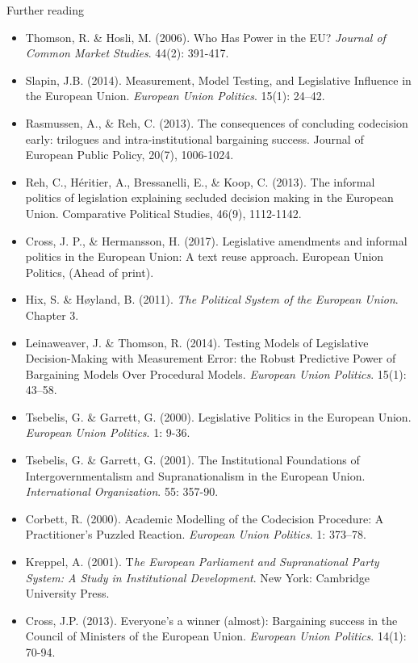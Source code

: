 \noindent Further reading

\begin{itemize}
	\item Thomson, R. \& Hosli, M. (2006). Who Has Power in the EU? \textit{Journal of Common Market Studies}. 44(2): 391-417.
	\item Slapin, J.B. (2014). Measurement, Model Testing, and Legislative Influence in the European Union. \textit{European Union Politics}. 15(1): 24–42.
	\item Rasmussen, A., \& Reh, C. (2013). The consequences of concluding codecision early: trilogues and intra-institutional bargaining success. Journal of European Public Policy, 20(7), 1006-1024.
	\item Reh, C., Héritier, A., Bressanelli, E., \& Koop, C. (2013). The informal politics of legislation explaining secluded decision making in the European Union. Comparative Political Studies, 46(9), 1112-1142.
	\item Cross, J. P., \& Hermansson, H. (2017). Legislative amendments and informal politics in the European Union: A text reuse approach. European Union Politics, (Ahead of print).
	\item Hix, S. \& H\o yland, B. (2011). \textit{The Political System of the European Union}. Chapter 3.
	\item Leinaweaver, J. \& Thomson, R. (2014). Testing Models of Legislative Decision-Making with Measurement Error: the Robust Predictive Power of Bargaining Models Over Procedural Models. \textit{European Union Politics}. 15(1): 43–58.
	\item Tsebelis, G. \& Garrett, G. (2000). Legislative Politics in the European Union. \textit{European Union Politics}. 1: 9-36.
	\item Tsebelis, G. \& Garrett, G. (2001). The Institutional Foundations of Intergovernmentalism and Supranationalism in the European Union. \textit{International Organization}. 55: 357-90.
	\item Corbett, R. (2000). Academic Modelling of the Codecision Procedure: A Practitioner’s Puzzled Reaction. \textit{European Union Politics}. 1: 373–78.
	\item Kreppel, A. (2001). T\textit{he European Parliament and Supranational Party System: A Study in Institutional Development}. New York: Cambridge University Press.
	\item Cross, J.P. (2013). Everyone’s a winner (almost): Bargaining success in the Council of Ministers of the European Union. \textit{European Union Politics}. 14(1): 70-94.

\end{itemize}
